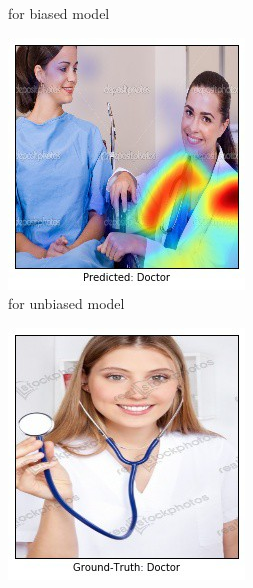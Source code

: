 \begin{figure}[ht!]
\begin{center}
\begin{subfigure}[b]{0.32\linewidth}
		\caption{\tiny{\gcam{} for biased model}}
        \vspace{10pt}
    \end{subfigure}
    \begin{subfigure}[b]{0.32\linewidth}
        \centering
        \includegraphics[width=1\linewidth]{figures/teaser/25_gcam_corr_balanced.jpg}
		\caption{\tiny{\gcam{} for unbiased model}}
        \vspace{10pt}
    \end{subfigure}
    \begin{subfigure}[b]{0.32\linewidth}
        \centering
        \includegraphics[width=1\linewidth]{figures/teaser/60_orig_balanced.jpg}

\end{subfigure}
\end{center}
\end{figure}
